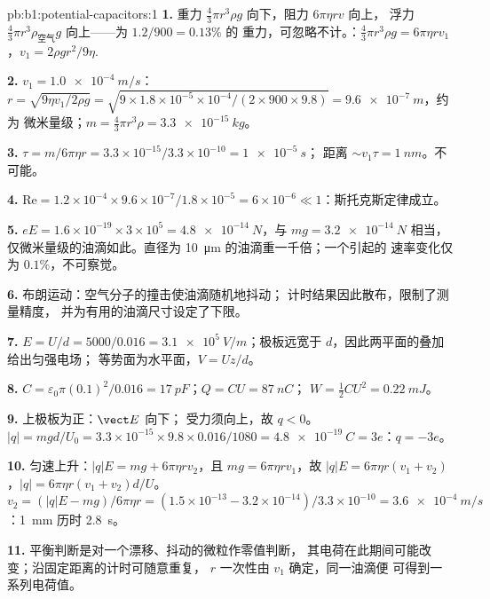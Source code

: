 \begin{solution}{pb:b1:potential-capacitors:1}
\textbf{1.} 重力 $\tfrac43\pi r^3\rho g$ 向下，阻力 $6\pi\eta rv$ 向上，
浮力 $\tfrac43\pi r^3\rho_{\text{空气}}g$ 向上——为 $1.2/900 = 0.13\%$ 的
重力，可忽略不计。：$\tfrac43\pi r^3\rho g = 6\pi\eta rv_1$，$v_1 =
2\rho gr^2/9\eta$.

\textbf{2.} $v_1 = \qty{1.0e-4}{m/s}$：$r = \sqrt{9\eta v_1/2\rho g} = \sqrt{9 \times
1.8 \times 10^{-5} \times 10^{-4}/(2 \times 900 \times 9.8)} = \qty{9.6e-7}{m}$，约为
微米量级；$m = \tfrac43\pi r^3\rho = \qty{3.3e-15}{kg}$。

\textbf{3.} $\tau = m/6\pi\eta r = 3.3 \times 10^{-15}/3.3 \times 10^{-10} = \qty{1e-5}{s}$；
距离 $\sim v_1\tau = \qty{1}{nm}$。不可能。

\textbf{4.} $\mathrm{Re} = 1.2 \times 10^{-4} \times 9.6 \times 10^{-7}/1.8 \times 10^{-5} =
6 \times 10^{-6} \ll 1$：斯托克斯定律成立。

\textbf{5.} $eE = 1.6 \times 10^{-19} \times 3 \times 10^5 = \qty{4.8e-14}{N}$，与
$mg = \qty{3.2e-14}{N}$ 相当，仅微米量级的油滴如此。直径为 \qty{10}{\micro m}
的油滴重一千倍；一个引起的
速率变化仅为 $0.1\%$，不可察觉。

\textbf{6.} 布朗运动：空气分子的撞击使油滴随机地抖动；
计时结果因此散布，限制了测量精度，
并为有用的油滴尺寸设定了下限。

\textbf{7.} $E = U/d = 5000/0.016 = \qty{3.1e5}{V/m}$；极板远宽于
$d$，因此两平面的叠加给出匀强电场；
等势面为水平面，$V = Uz/d$。

\textbf{8.} $C = \varepsilon_0\pi(0.1)^2/0.016 = \qty{17}{pF}$；$Q = CU = \qty{87}{nC}$；
$W = \tfrac12CU^2 = \qty{0.22}{mJ}$。

\textbf{9.} 上极板为正：$\vect E$ 向下；
受力须向上，故 $q < 0$。$|q| = mgd/U_0 = 3.3 \times 10^{-15} \times 9.8 \times 0.016/
1080 = \qty{4.8e-19}{C} = 3e$：$q = -3e$。

\textbf{10.} 匀速上升：$|q|E = mg + 6\pi\eta rv_2$，且 $mg =
6\pi\eta rv_1$，故 $|q|E = 6\pi\eta r(v_1 + v_2)$，$|q| = 6\pi\eta r(v_1 +
v_2)d/U$。$v_2 = (|q|E - mg)/6\pi\eta r = (1.5 \times 10^{-13} - 3.2 \times 10^{-14})/
3.3 \times 10^{-10} = \qty{3.6e-4}{m/s}$：\qty{1}{mm} 历时 \qty{2.8}{s}。

\textbf{11.} 平衡判断是对一个漂移、抖动的微粒作零值判断，
其电荷在此期间可能改变；沿固定距离的计时可随意重复，
$r$ 一次性由 $v_1$ 确定，同一油滴便
可得到一系列电荷值。


\end{solution}
